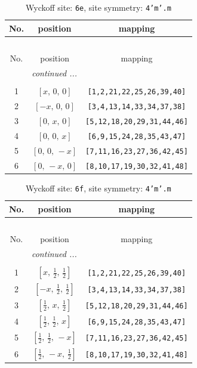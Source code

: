 \documentclass[fleqn,8pt]{jsarticle}
\begin{document}
\renewcommand{\arraystretch}{1.2}
\begin{longtable}{ccc}
\caption{Wyckoff site: {\tt 6e}, site symmetry: {\tt 4'm'.m}}
 \\
 \hline \hline
No. & position & mapping \\ \hline \endfirsthead

\multicolumn{2}{l}{\tablename\ \thetable{}} \\
 \hline \hline
No. & position & mapping \\ \hline \endhead

 \hline \hline
\multicolumn{2}{r}{\footnotesize\it continued ...} \\ \endfoot

 \hline \hline
\multicolumn{2}{r}{} \\ \endlastfoot

1 & $\left[ x,\, 0,\, 0 \right]$ & {\tt [1,2,21,22,25,26,39,40]} \\ \hline
2 & $\left[ - x,\, 0,\, 0 \right]$ & {\tt [3,4,13,14,33,34,37,38]} \\ \hline
3 & $\left[ 0,\, x,\, 0 \right]$ & {\tt [5,12,18,20,29,31,44,46]} \\ \hline
4 & $\left[ 0,\, 0,\, x \right]$ & {\tt [6,9,15,24,28,35,43,47]} \\ \hline
5 & $\left[ 0,\, 0,\, - x \right]$ & {\tt [7,11,16,23,27,36,42,45]} \\ \hline
6 & $\left[ 0,\, - x,\, 0 \right]$ & {\tt [8,10,17,19,30,32,41,48]} \\
\end{longtable}
\renewcommand{\arraystretch}{1.2}
\begin{longtable}{ccc}
\caption{Wyckoff site: {\tt 6f}, site symmetry: {\tt 4'm'.m}}
 \\
 \hline \hline
No. & position & mapping \\ \hline \endfirsthead

\multicolumn{2}{l}{\tablename\ \thetable{}} \\
 \hline \hline
No. & position & mapping \\ \hline \endhead

 \hline \hline
\multicolumn{2}{r}{\footnotesize\it continued ...} \\ \endfoot

 \hline \hline
\multicolumn{2}{r}{} \\ \endlastfoot

1 & $\left[ x,\, \frac{1}{2},\, \frac{1}{2} \right]$ & {\tt [1,2,21,22,25,26,39,40]} \\ \hline
2 & $\left[ - x,\, \frac{1}{2},\, \frac{1}{2} \right]$ & {\tt [3,4,13,14,33,34,37,38]} \\ \hline
3 & $\left[ \frac{1}{2},\, x,\, \frac{1}{2} \right]$ & {\tt [5,12,18,20,29,31,44,46]} \\ \hline
4 & $\left[ \frac{1}{2},\, \frac{1}{2},\, x \right]$ & {\tt [6,9,15,24,28,35,43,47]} \\ \hline
5 & $\left[ \frac{1}{2},\, \frac{1}{2},\, - x \right]$ & {\tt [7,11,16,23,27,36,42,45]} \\ \hline
6 & $\left[ \frac{1}{2},\, - x,\, \frac{1}{2} \right]$ & {\tt [8,10,17,19,30,32,41,48]} \\
\end{longtable}
\end{document}
